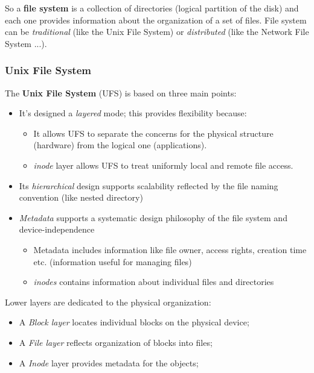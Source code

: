 So a \textbf{file system} is a collection of directories (logical partition of the disk) and each one provides information about the organization of a set of files.
File system can be \textit{traditional} (like the Unix File System) or \textit{distributed} (like the Network File System ...).


\subsubsection{Unix File System}
The \textbf{Unix File System} (UFS) is based on three main points:
\begin{itemize}
    \item It's designed a \textit{layered} mode; this provides flexibility because:
    \begin{itemize}
        \item It allows UFS to separate the concerns for the physical structure (hardware) from the logical one (applications).
        \item \textit{inode} layer allows UFS to treat uniformly local and remote file access.
    \end{itemize}
    \item Its \textit{hierarchical} design supports scalability reflected by the file naming convention (like nested directory)
    \item \textit{Metadata} supports a systematic design philosophy of the file system and device-independence
    \begin{itemize}
        \item Metadata includes information like file owner, access rights, creation time etc. (information useful for managing files)
        \item \textit{inodes} contains information about individual files and directories
    \end{itemize}   
\end{itemize}   

Lower layers are dedicated to the physical organization:
\begin{itemize}
    \item A \textit{Block layer} locates individual blocks on the physical device;
    \item A \textit{File layer} reflects organization of blocks into files;
    \item A \textit{Inode} layer provides metadata for the objects;
\end{itemize}

